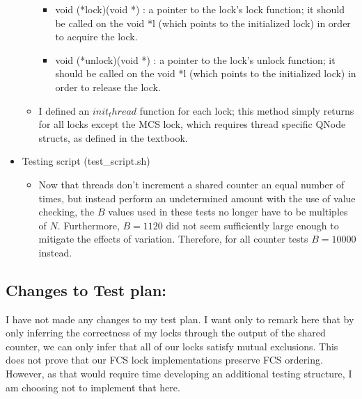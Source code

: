 \documentclass[]{article}
\begin{document}
\begin{itemize}
\begin{itemize}
\begin{itemize}
			\item void (*lock)(void *) : a pointer to the lock's lock function; it should be called on the void *l (which points to the initialized lock) in order to acquire the lock. 
			
			\item void (*unlock)(void *) : a pointer to the lock's unlock function; it should be called on the void *l (which points to the initialized lock) in order to release the lock. 
		\end{itemize}
		\item I defined an $init_thread$ function for each lock; this method simply returns for all locks except the MCS lock, which requires thread specific QNode structs, as defined in the textbook.
	\end{itemize}
	\item Testing script (test\_script.sh)
	\begin{itemize}
		\item Now that threads don't increment a shared counter an equal number of times, but instead perform an undetermined amount with the use of value checking, the $B$ values used in these tests no longer have to be multiples of $N$. Furthermore, $B = 1120$ did not seem sufficiently large enough to mitigate the effects of variation. Therefore, for all counter tests $B = 10000$ instead.
	\end{itemize}
\end{itemize}

\subsection{Changes to Test plan:}
I have not made any changes to my test plan. I want only to remark here that by only inferring the correctness of my locks through the output of the shared counter, we can only infer that all of our locks satisfy mutual exclusions. This does not prove that our FCS lock implementations preserve FCS ordering. However, as that would require time developing an additional testing structure, I am choosing not to implement that here.
\end{document}
